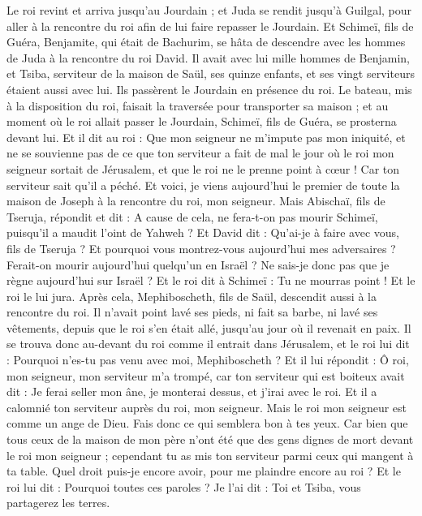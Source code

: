 \begin{multicols}{2}
Le roi revint et arriva jusqu'au Jourdain ; et Juda se rendit jusqu'à Guilgal, pour aller à la rencontre du roi afin de lui faire repasser le Jourdain.
Et Schimeï, fils de Guéra, Benjamite, qui était de Bachurim, se hâta de descendre avec les hommes de Juda à la rencontre du roi David.
Il avait avec lui mille hommes de Benjamin, et Tsiba, serviteur de la maison de Saül, ses quinze enfants, et ses vingt serviteurs étaient aussi avec lui. Ils passèrent le Jourdain en présence du roi.
Le bateau, mis à la disposition du roi, faisait la traversée pour transporter sa maison ; et au moment où le roi allait passer le Jourdain, Schimeï, fils de Guéra, se prosterna devant lui.
Et il dit au roi : Que mon seigneur ne m'impute pas mon iniquité, et ne se souvienne pas de ce que ton serviteur a fait de mal le jour où le roi mon seigneur sortait de Jérusalem, et que le roi ne le prenne point à cœur !
Car ton serviteur sait qu'il a péché. Et voici, je viens aujourd'hui le premier de toute la maison de Joseph à la rencontre du roi, mon seigneur.
Mais Abischaï, fils de Tseruja, répondit et dit : A cause de cela, ne fera-t-on pas mourir Schimeï, puisqu'il a maudit l'oint de Yahweh ?
Et David dit : Qu'ai-je à faire avec vous, fils de Tseruja ? Et pourquoi vous montrez-vous aujourd'hui mes adversaires ? Ferait-on mourir aujourd'hui quelqu'un en Israël ? Ne sais-je donc pas que je règne aujourd'hui sur Israël ?
Et le roi dit à Schimeï : Tu ne mourras point ! Et le roi le lui jura.
Après cela, Mephiboscheth, fils de Saül, descendit aussi à la rencontre du roi. Il n'avait point lavé ses pieds, ni fait sa barbe, ni lavé ses vêtements, depuis que le roi s'en était allé, jusqu'au jour où il revenait en paix.
Il se trouva donc au-devant du roi comme il entrait dans Jérusalem, et le roi lui dit : Pourquoi n'es-tu pas venu avec moi, Mephiboscheth ?
Et il lui répondit : Ô roi, mon seigneur, mon serviteur m'a trompé, car ton serviteur qui est boiteux avait dit : Je ferai seller mon âne, je monterai dessus, et j'irai avec le roi.
Et il a calomnié ton serviteur auprès du roi, mon seigneur. Mais le roi mon seigneur est comme un ange de Dieu. Fais donc ce qui semblera bon à tes yeux.
Car bien que tous ceux de la maison de mon père n'ont été que des gens dignes de mort devant le roi mon seigneur ; cependant tu as mis ton serviteur parmi ceux qui mangent à ta table. Quel droit puis-je encore avoir, pour me plaindre encore au roi ?
Et le roi lui dit : Pourquoi toutes ces paroles ? Je l'ai dit : Toi et Tsiba, vous partagerez les terres.

\end{multicols}
